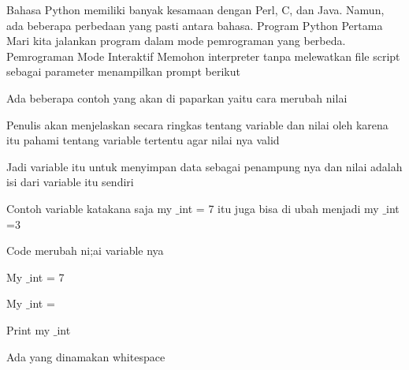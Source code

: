 \documentclass[a4paper,12pt]{report}
\begin{document}
\vspace{14pt}
\noindent 
{\fontsize{14pt}{14pt}\selectfont \vspace{\baselineskip}
Bahasa Python memiliki banyak kesamaan dengan Perl, C, dan Java. Namun, ada beberapa perbedaan yang pasti antara bahasa. Program Python Pertama Mari kita jalankan program dalam mode pemrograman yang berbeda. Pemrograman Mode Interaktif Memohon interpreter tanpa melewatkan file script sebagai parameter menampilkan prompt berikut  \\} \par
\vspace{14pt}
\noindent 
{\fontsize{14pt}{14pt}\selectfont Ada beberapa contoh yang akan di paparkan yaitu cara merubah nilai \\} \par
\noindent 
{\fontsize{14pt}{14pt}\selectfont Penulis akan menjelaskan secara ringkas tentang variable dan nilai oleh karena itu pahami tentang variable tertentu agar nilai nya valid \\} \par
\vspace{14pt}
\noindent 
{\fontsize{14pt}{14pt}\selectfont Jadi variable itu untuk menyimpan data sebagai penampung nya dan nilai adalah isi dari variable itu sendiri \\} \par
\vspace{14pt}
\noindent 
{\fontsize{14pt}{14pt}\selectfont Contoh variable katakana saja my $  \_  $int = 7 itu juga bisa di ubah menjadi my $  \_  $int =3  \\} \par
\vspace{14pt}
\noindent 
{\fontsize{14pt}{14pt}\selectfont Code merubah ni;ai variable nya  \\} \par
\noindent 
{\fontsize{14pt}{14pt}\selectfont My $  \_  $int = 7 \\} \par
\noindent 
{\fontsize{14pt}{14pt}\selectfont My $  \_  $int = \\} \par
\noindent 
{\fontsize{14pt}{14pt}\selectfont Print my $  \_  $int \\} \par
\vspace{14pt}
\noindent 
{\fontsize{14pt}{14pt}\selectfont Ada yang dinamakan whitespace  \\} \par
\vspace{14pt}
\end{document}
